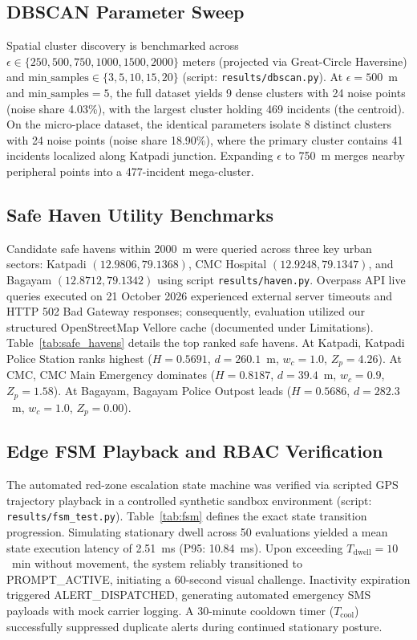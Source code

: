 \documentclass[conference]{IEEEtran}
\begin{document}
\subsection{DBSCAN Parameter Sweep}
Spatial cluster discovery is benchmarked across $\epsilon \in \{250, 500, 750, 1000, 1500, 2000\}$ meters (projected via Great-Circle Haversine) and $\text{min\_samples} \in \{3, 5, 10, 15, 20\}$ (script: \texttt{results/dbscan.py}). At $\epsilon = 500$~m and $\text{min\_samples} = 5$, the full dataset yields 9 dense clusters with 24 noise points (noise share 4.03\%), with the largest cluster holding 469 incidents (the centroid). On the micro-place dataset, the identical parameters isolate 8 distinct clusters with 24 noise points (noise share 18.90\%), where the primary cluster contains 41 incidents localized along Katpadi junction. Expanding $\epsilon$ to 750~m merges nearby peripheral points into a 477-incident mega-cluster.

\subsection{Safe Haven Utility Benchmarks}
Candidate safe havens within 2000~m were queried across three key urban sectors: Katpadi $(12.9806, 79.1368)$, CMC Hospital $(12.9248, 79.1347)$, and Bagayam $(12.8712, 79.1342)$ using script \texttt{results/haven.py}. Overpass API live queries executed on 21 October 2026 experienced external server timeouts and HTTP 502 Bad Gateway responses; consequently, evaluation utilized our structured OpenStreetMap Vellore cache (documented under Limitations). Table~\ref{tab:safe_havens} details the top ranked safe havens. At Katpadi, Katpadi Police Station ranks highest ($H = 0.5691$, $d = 260.1$~m, $w_c = 1.0$, $Z_p = 4.26$). At CMC, CMC Main Emergency dominates ($H = 0.8187$, $d = 39.4$~m, $w_c = 0.9$, $Z_p = 1.58$). At Bagayam, Bagayam Police Outpost leads ($H = 0.5686$, $d = 282.3$~m, $w_c = 1.0$, $Z_p = 0.00$).

\subsection{Edge FSM Playback and RBAC Verification}
The automated red-zone escalation state machine was verified via scripted GPS trajectory playback in a controlled synthetic sandbox environment (script: \texttt{results/fsm\_test.py}). Table~\ref{tab:fsm} defines the exact state transition progression. Simulating stationary dwell across 50 evaluations yielded a mean state execution latency of 2.51~ms (P95: 10.84~ms). Upon exceeding $T_{\text{dwell}} = 10$~min without movement, the system reliably transitioned to PROMPT\_ACTIVE, initiating a 60-second visual challenge. Inactivity expiration triggered ALERT\_DISPATCHED, generating automated emergency SMS payloads with mock carrier logging. A 30-minute cooldown timer ($T_{\text{cool}}$) successfully suppressed duplicate alerts during continued stationary posture.
\end{document}
